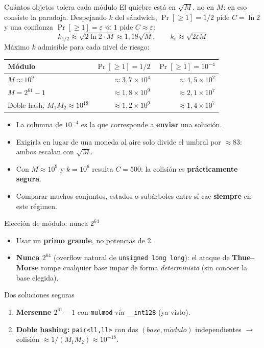 \documentclass{beamer}
\begin{document}
\begin{frame}{Cuántos objetos tolera cada módulo}
\footnotesize
El quiebre está en $\sqrt{M}$, no en $M$: en eso consiste la paradoja. Despejando $k$ del sándwich, $\Pr[\ge 1] = 1/2$ pide $C = \ln 2$ y una confianza $\Pr[\ge 1] = \varepsilon \ll 1$ pide $C \approx \varepsilon$:
\[ k_{1/2} \approx \sqrt{2\ln 2 \cdot M} \approx 1{,}18\sqrt{M}, \qquad k_{\varepsilon} \approx \sqrt{2\varepsilon M} \]
\pause
Máximo $k$ admisible para cada nivel de riesgo:
\begin{center}
\begin{tabular}{l r r}
\textbf{Módulo} & $\Pr[\ge 1] = 1/2$ & $\Pr[\ge 1] = 10^{-4}$ \\
\hline
$M \approx 10^9$ & $\approx 3{,}7 \times 10^{4}$ & $\approx 4{,}5 \times 10^{2}$ \\
$M = 2^{61}-1$ & $\approx 1{,}8 \times 10^{9}$ & $\approx 2{,}1 \times 10^{7}$ \\
Doble hash, $M_1 M_2 \approx 10^{18}$ & $\approx 1{,}2 \times 10^{9}$ & $\approx 1{,}4 \times 10^{7}$ \\
\end{tabular}
\end{center}
\pause
\begin{itemize}
    \item La columna de $10^{-4}$ es la que corresponde a \textbf{enviar} una solución.
    \item Exigirla en lugar de una moneda al aire solo divide el umbral por $\approx 83$: ambos escalan con $\sqrt{M}$.
    \item Con $M \approx 10^9$ y $k = 10^6$ resulta $C = 500$: la colisión es \textbf{prácticamente segura}.
    \item Comparar muchos conjuntos, estados o subárboles entre sí cae \textbf{siempre} en este régimen.
\end{itemize}
\end{frame}

\begin{frame}{Elección de módulo: nunca $2^{64}$}
\begin{itemize}
    \item Usar un \textbf{primo grande}, no potencias de 2.
    \item \textbf{Nunca $2^{64}$} (overflow natural de \texttt{unsigned long long}): el ataque de \textbf{Thue--Morse} rompe cualquier base impar de forma \emph{determinista} (sin conocer la base elegida).
\end{itemize}
\begin{block}{Dos soluciones seguras}
\begin{enumerate}
    \item \textbf{Mersenne $2^{61}-1$} con \texttt{mulmod} vía \texttt{\_\_int128} (ya visto).
    \item \textbf{Doble hashing:} \texttt{pair<ll,ll>} con dos $(base, m\acute{o}dulo)$ independientes $\to$ colisión $\approx 1/(M_1 M_2) \approx 10^{-18}$.
\end{enumerate}
\end{block}
\end{frame}
\end{document}

